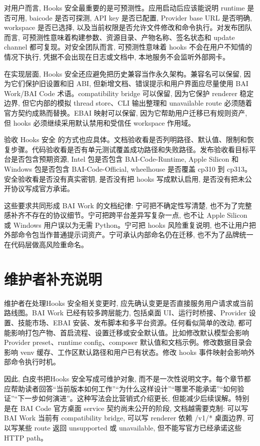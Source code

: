 对用户而言, Hooks 安全最重要的是可预测性。应用启动后应该能说明 runtime 是否可用, baicode 是否可探测, API key 是否已配置, Provider base URL 是否明确, workspace 是否已选择, 以及当前权限是否允许文件修改和命令执行。对发布团队而言, 可预测性意味着构建参数、资源目录、产物名称、签名状态和 update channel 都可复现。对安全团队而言, 可预测性意味着 hooks 不会在用户不知情的情况下执行, 凭据不会出现在日志或文档中, 本地服务不会监听外部网卡。

在实现层面, Hooks 安全还应避免把历史兼容当作永久架构。兼容名可以保留, 因为它们保护旧设置和旧 ABI, 但新增文档、错误提示和用户界面应尽量使用 BAI Work/BAI Code 术语。compatibility bridge 可以保留, 因为它保护 renderer 稳定边界, 但它内部的模拟 thread store、CLI 输出整理和 unavailable route 必须随着官方契约成熟而替换。EBAI 映射可以保留, 因为它帮助用户迁移已有规则资产, 但 hooks 必须继续采用默认禁用和受信任 workspace 作用域。

验收 Hooks 安全 的方式也应具体。文档验收看是否列明路径、默认值、限制和恢复步骤。代码验收看是否有单元测试覆盖成功路径和失败路径。发布验收看目标平台是否包含预期资源, Intel 包是否包含 BAI-Code-Runtime, Apple Silicon 和 Windows 包是否包含 BAI-Code-Official, wheelhouse 是否覆盖 cp310 到 cp313。安全验收看是否没有真实密钥, 是否没有把 hooks 写成默认启用, 是否没有把未公开协议写成官方承诺。

这些要求共同形成 BAI Work 的文档纪律: 宁可把不确定性写清楚, 也不为了完整感补齐不存在的协议细节。宁可把跨平台差异写复杂一点, 也不让 Apple Silicon 或 Windows 用户误以为无需 Python。宁可把 hooks 风险重复说明, 也不让用户把外部命令包当作普通提示词资产。宁可承认内部命名仍在迁移, 也不为了品牌统一在代码层做高风险重命名。

\section{维护者补充说明}

维护者在处理Hooks 安全相关变更时, 应先确认变更是否直接服务用户请求或当前路线图。BAI Work 已经有较多跨层能力, 包括桌面 UI、运行时桥接、Provider 设置、技能市场、EBAI 安装、发布脚本和多平台资源。任何看似简单的改动, 都可能影响打包产物、首启流程、设置迁移或安全默认值。比如修改默认模型会影响 Provider preset、runtime config、composer 默认值和文档示例。修改数据目录会影响 venv 缓存、工作区默认路径和用户已有状态。修改 hooks 事件映射会影响外部命令执行时机。

因此, 白皮书把Hooks 安全写成可维护对象, 而不是一次性说明文字。每个章节都应帮助读者回答“当前版本如何工作”“为什么这样设计”“哪里不能承诺”“如何验证”“下一步如何演进”。这种写法会比营销式介绍更长, 但能减少后续误解。特别是在 BAI Code 官方桌面 service 契约尚未公开的阶段, 文档越需要克制: 可以写 BAI Work 当前有 compatibility bridge, 可以写 renderer 依赖 /v1/* 桌面边界, 可以写某些 route 返回 unsupported 或 unavailable, 但不能写官方已经承诺这些 HTTP path。

